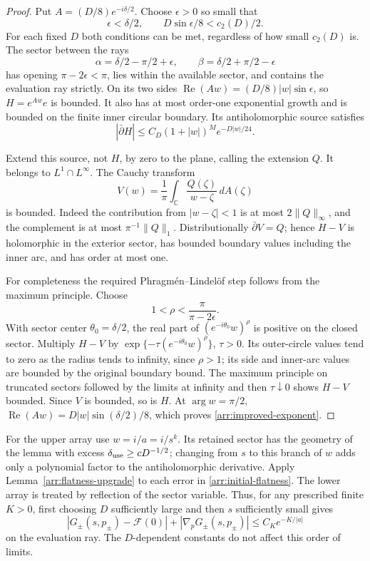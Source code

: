 \begin{proof}
Put \(A=(D/8)e^{-i\delta/2}\).
Choose \(\epsilon>0\) so small that
\[
 \epsilon<\delta/2,\qquad
 D\sin\epsilon/8<c_2(D)/2.
\]
For each fixed \(D\) both conditions can be met, regardless
of how small \(c_2(D)\) is.
The sector between the rays
\[
 \alpha=\delta/2-\pi/2+\epsilon,\qquad
 \beta=\delta/2+\pi/2-\epsilon
\]
has opening \(\pi-2\epsilon<\pi\), lies within the
available sector, and contains the evaluation ray strictly.
On its two sides \(\operatorname{Re}(Aw)
=(D/8)|w|\sin\epsilon\), so \(H=e^{Aw}e\) is bounded.
It also has at most order-one exponential growth and is
bounded on the finite inner circular boundary.
Its antiholomorphic source satisfies
\[
 |\bar\partial H|\le C_D(1+|w|)^M e^{-D|w|/24}.
\]

Extend this source, not \(H\), by zero to the plane, calling
the extension \(Q\).  It belongs to \(L^1\cap L^\infty\).
The Cauchy transform
\[
 V(w)=\frac1\pi\int_{\mathbb C}
             \frac{Q(\zeta)}{w-\zeta}\,dA(\zeta)
\]
is bounded.  Indeed the contribution from
\(|w-\zeta|<1\) is at most \(2\|Q\|_\infty\), and the
complement is at most \(\pi^{-1}\|Q\|_1\).
Distributionally \(\bar\partial V=Q\); hence \(H-V\) is
holomorphic in the exterior sector, has bounded boundary
values including the inner arc, and has order at most one.

For completeness the required Phragm\'en--Lindel\"of step
follows from the maximum principle.  Choose
\[
 1<\rho<\frac{\pi}{\pi-2\epsilon}.
\]
With sector center \(\theta_0=\delta/2\), the real part of
\((e^{-i\theta_0}w)^\rho\) is positive on the closed sector.
Multiply \(H-V\) by
\(\exp\{-\tau(e^{-i\theta_0}w)^\rho\}\), \(\tau>0\).
Its outer-circle values tend to zero as the radius tends
to infinity, since \(\rho>1\); its side and inner-arc
values are bounded by the original boundary bound.
The maximum principle on truncated sectors followed by
the limits at infinity and then \(\tau\downarrow0\)
shows \(H-V\) bounded.  Since \(V\) is bounded, so is \(H\).
At \(\arg w=\pi/2\),
\(\operatorname{Re}(Aw)=D|w|\sin(\delta/2)/8\),
which proves \eqref{arr:improved-exponent}.
\end{proof}

For the upper array use \(w=i/a=i/s^k\).
Its retained sector has the geometry of the lemma with excess
$\delta_{\rm use}\ge cD^{-1/2}$; changing from
\(s\) to this branch of \(w\) adds only a polynomial
factor to the antiholomorphic derivative.
Apply Lemma~\ref{arr:flatness-upgrade} to each error in
\eqref{arr:initial-flatness}.  The lower array is treated
by reflection of the sector variable.  Thus, for any
prescribed finite \(K>0\), first choosing \(D\) sufficiently
large and then \(s\) sufficiently small gives
\begin{equation}\label{arr:arbitrary-flatness}
 |G_\pm(s,p_\pm)-\mathcal F(0)|
       +|\nabla_pG_\pm(s,p_\pm)|
      \le C_K e^{-K/|a|}
\end{equation}
on the evaluation ray.  The \(D\)-dependent constants
do not affect this order of limits.

